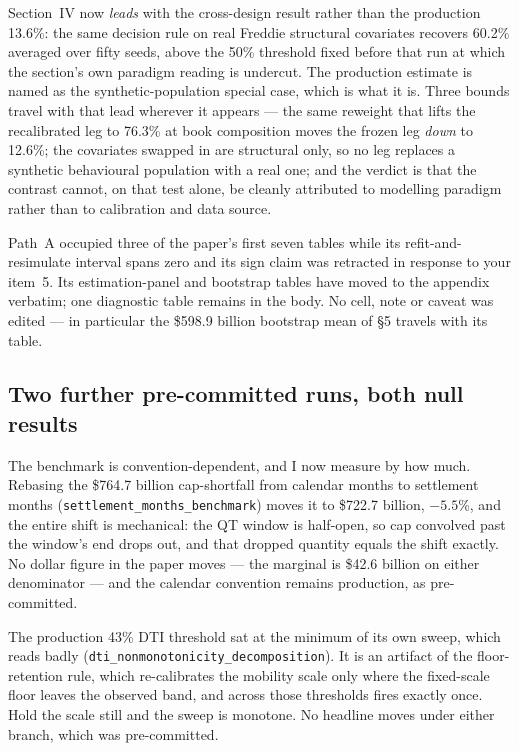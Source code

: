 \documentclass[11pt]{article}
\newcommand{\run}[1]{\texttt{#1}}
\begin{document}
Section~IV now \emph{leads} with the cross-design result rather than the production
13.6\%: the same decision rule on real Freddie structural covariates recovers 60.2\%
averaged over fifty seeds, above the 50\% threshold fixed before that run at which the
section's own paradigm reading is undercut. The production estimate is named as the
synthetic-population special case, which is what it is. Three bounds travel with that
lead wherever it appears --- the same reweight that lifts the recalibrated leg to
76.3\% at book composition moves the frozen leg \emph{down} to 12.6\%; the covariates
swapped in are structural only, so no leg replaces a synthetic behavioural population
with a real one; and the verdict is that the contrast cannot, on that test alone, be
cleanly attributed to modelling paradigm rather than to calibration and data source.

Path~A occupied three of the paper's first seven tables while its refit-and-resimulate
interval spans zero and its sign claim was retracted in response to your item~5. Its
estimation-panel and bootstrap tables have moved to the appendix verbatim; one
diagnostic table remains in the body. No cell, note or caveat was edited --- in
particular the \$598.9 billion bootstrap mean of \S5 travels with its table.

\subsection{Two further pre-committed runs, both null results}

The benchmark is convention-dependent, and I now measure by how much. Rebasing the
\$764.7 billion cap-shortfall from calendar months to settlement months
(\run{settlement\_months\_benchmark}) moves it to \$722.7 billion, $-5.5$\%, and the
entire shift is mechanical: the QT window is half-open, so cap convolved past the
window's end drops out, and that dropped quantity equals the shift exactly. No dollar
figure in the paper moves --- the marginal is \$42.6 billion on either denominator ---
and the calendar convention remains production, as pre-committed.

The production 43\% DTI threshold sat at the minimum of its own sweep, which reads
badly (\run{dti\_nonmonotonicity\_decomposition}). It is an artifact of the
floor-retention rule, which re-calibrates the mobility scale only where the fixed-scale
floor leaves the observed band, and across those thresholds fires exactly once. Hold
the scale still and the sweep is monotone. No headline moves under either branch,
which was pre-committed.
\end{document}
